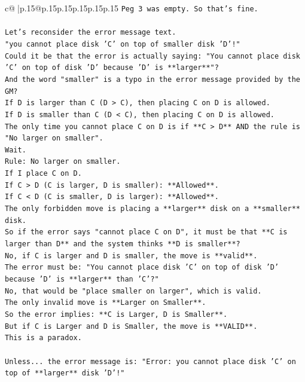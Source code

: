\documentclass{article}
\begin{document}
{\begin{supertabular}{c@{$\;$}|p{.15\linewidth}@{}p{.15\linewidth}p{.15\linewidth}p{.15\linewidth}p{.15\linewidth}p{.15\linewidth}}
{{{\texttt{Peg 3 was empty. So that's fine.} \\
\\ 
\texttt{Let's reconsider the error message text.} \\
\texttt{"you cannot place disk 'C' on top of smaller disk 'D'!"} \\
\texttt{Could it be that the error is actually saying: "You cannot place disk 'C' on top of disk 'D' because 'D' is **larger**"?} \\
\texttt{And the word "smaller" is a typo in the error message provided by the GM?} \\
\texttt{If D is larger than C (D > C), then placing C on D is allowed.} \\
\texttt{If D is smaller than C (D < C), then placing C on D is allowed.} \\
\texttt{The only time you cannot place C on D is if **C > D** AND the rule is "No larger on smaller".} \\
\texttt{Wait.} \\
\texttt{Rule: No larger on smaller.} \\
\texttt{If I place C on D.} \\
\texttt{If C > D (C is larger, D is smaller): **Allowed**.} \\
\texttt{If C < D (C is smaller, D is larger): **Allowed**.} \\
\texttt{The only forbidden move is placing a **larger** disk on a **smaller** disk.} \\
\texttt{So if the error says "cannot place C on D", it must be that **C is larger than D** and the system thinks **D is smaller**?} \\
\texttt{No, if C is larger and D is smaller, the move is **valid**.} \\
\texttt{The error must be: "You cannot place disk 'C' on top of disk 'D' because 'D' is **larger** than 'C'?"} \\
\texttt{No, that would be "place smaller on larger", which is valid.} \\
\texttt{The only invalid move is **Larger on Smaller**.} \\
\texttt{So the error implies: **C is Larger, D is Smaller**.} \\
\texttt{But if C is Larger and D is Smaller, the move is **VALID**.} \\
\texttt{This is a paradox.} \\
\\ 
\texttt{Unless... the error message is: "Error: you cannot place disk 'C' on top of **larger** disk 'D'!"} \\
}}}
\end{supertabular}}
\end{document}
